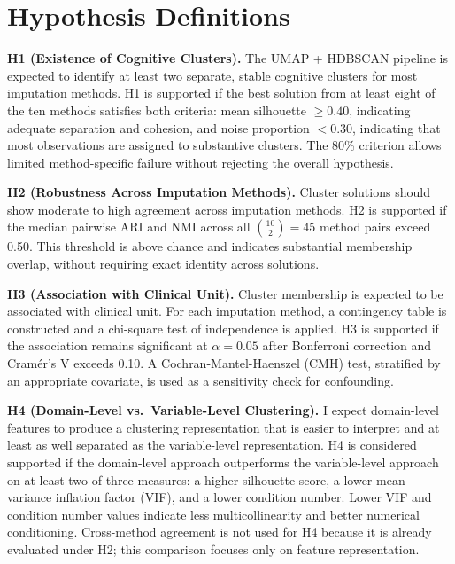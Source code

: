 
\section{Hypothesis Definitions}\label{sec:hypotheses}

\noindent \textbf{H1 (Existence of Cognitive Clusters).} The UMAP + HDBSCAN pipeline is expected to identify at least two separate, stable cognitive clusters for most imputation methods. H1 is supported if the best solution from at least eight of the ten methods satisfies both criteria: mean silhouette $\ge 0.40$, indicating adequate separation and cohesion, and noise proportion $< 0.30$, indicating that most observations are assigned to substantive clusters. The 80\% criterion allows limited method-specific failure without rejecting the overall hypothesis.

\noindent \textbf{H2 (Robustness Across Imputation Methods).} Cluster solutions should show moderate to high agreement across imputation methods. H2 is supported if the median pairwise ARI and NMI across all $\binom{10}{2} = 45$ method pairs exceed 0.50. This threshold is above chance and indicates substantial membership overlap, without requiring exact identity across solutions.

\noindent \textbf{H3 (Association with Clinical Unit).} Cluster membership is expected to be associated with clinical unit. For each imputation method, a contingency table is constructed and a chi-square test of independence is applied. H3 is supported if the association remains significant at $\alpha = 0.05$ after Bonferroni correction and Cram\'{e}r's V exceeds 0.10. A Cochran-Mantel-Haenszel (CMH) test, stratified by an appropriate covariate, is used as a sensitivity check for confounding.

\noindent \textbf{H4 (Domain-Level vs.\ Variable-Level Clustering).} I expect domain-level features to produce a clustering representation that is easier to interpret and at least as well separated as the variable-level representation. H4 is considered supported if the domain-level approach outperforms the variable-level approach on at least two of three measures: a higher silhouette score, a lower mean variance inflation factor (VIF), and a lower condition number. Lower VIF and condition number values indicate less multicollinearity and better numerical conditioning. Cross-method agreement is not used for H4 because it is already evaluated under H2; this comparison focuses only on feature representation.

